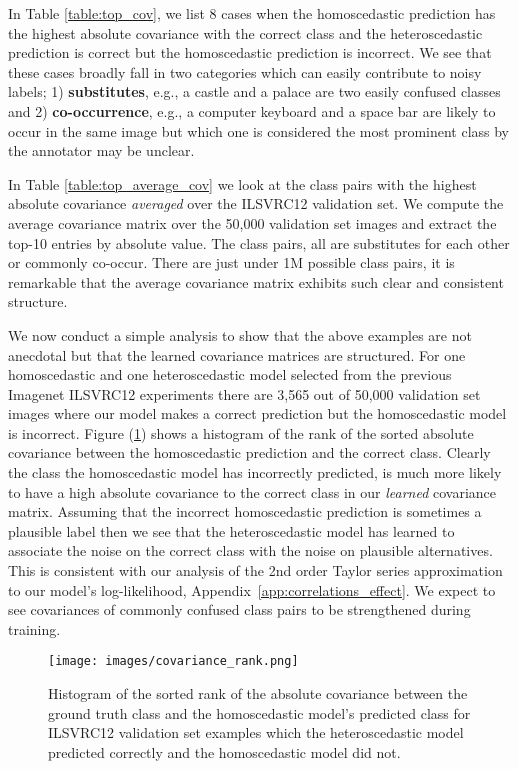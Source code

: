 \documentclass[final]{cvpr}
\begin{document}
In Table \ref{table:top_cov}, we list 8 cases when the homoscedastic prediction has the highest absolute covariance with the correct class and the heteroscedastic prediction is correct but the homoscedastic prediction is incorrect. We see that these cases broadly fall in two categories which can easily contribute to noisy labels; 1) \textbf{substitutes}, e.g., a castle and a palace are two easily confused classes and 2) \textbf{co-occurrence}, e.g., a computer keyboard and a space bar are likely to occur in the same image but which one is considered the most prominent class by the annotator may be unclear.

In Table \ref{table:top_average_cov} we look at the class pairs with the highest absolute covariance \textit{averaged} over the ILSVRC12 validation set. We compute the average covariance matrix over the 50,000 validation set images and extract the top-10 entries by absolute value. The class pairs, all are substitutes for each other or commonly co-occur. There are just under 1M possible class pairs, it is remarkable that the average covariance matrix exhibits such clear and consistent structure.

We now conduct a simple analysis to show that the above examples are not anecdotal but that the learned covariance matrices are structured. For one homoscedastic and one heteroscedastic model selected from the previous Imagenet ILSVRC12 experiments there are 3,565 out of 50,000 validation set images where our model makes a correct prediction but the homoscedastic model is incorrect. Figure (\ref{fig:covariance_rank}) shows a histogram of the rank of the sorted absolute covariance between the homoscedastic prediction and the correct class. Clearly the class the homoscedastic model has incorrectly predicted, is much more likely to have a high absolute covariance to the correct class in our \textit{learned} covariance matrix. Assuming that the incorrect homoscedastic prediction is sometimes a plausible label then we see that the heteroscedastic model has learned to associate the noise on the correct class with the noise on plausible alternatives. This is consistent with our analysis of the 2nd order Taylor series approximation to our model's log-likelihood, Appendix~\ref{app:correlations_effect}. We expect to see covariances of commonly confused class pairs to be strengthened during training.

\begin{figure}
    \centering
    \texttt{[image: images/covariance\_rank.png]}
    \caption{Histogram of the sorted rank of the absolute covariance between the ground truth class and the homoscedastic model's predicted class for ILSVRC12 validation set examples which the heteroscedastic model predicted correctly and the homoscedastic model did not.}
    \label{fig:covariance_rank}
\end{figure}
\end{document}
